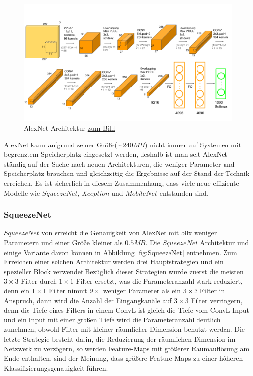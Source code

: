 \documentclass[12pt,a4paper]{scrartcl}
\numberwithin{equation}{section}
\begin{document}
\begin{figure}[h]
	\centering
	\includegraphics[width=\textwidth ]{AlexNet}
	\caption{ AlexNet Architektur \href{https://neurohive.io/en/popular-networks/alexnet-imagenet-classification-with-deep-convolutional-neural-networks/}{ zum Bild} }
	\label{fig:AlexNet}
\end{figure}


AlexNet kann aufgrund seiner Größe($\sim240MB$) nicht immer auf Systemen mit begrenztem Speicherplatz eingesetzt werden, deshalb ist man seit AlexNet ständig auf der Suche nach neuen Architekturen, die weniger Parameter und Speicherplatz brauchen und  gleichzeitig die Ergebnisse auf der Stand der Technik erreichen. Es ist sicherlich  in diesem Zusammenhang, dass viele neue effiziente Modelle wie $ SqueezeNet $, $ Xception $ und $ MobileNet $ entstanden sind.\\


\subsubsection{SqueezeNet}
$ SqueezeNet $ von \cite[Song Han et al]{SqueezeNet} erreicht die Genauigkeit von AlexNet mit 50x weniger Parametern und  einer Größe kleiner als $ 0.5MB$. Die $ SqueezeNet $ Architektur und einige Variante davon können in Abbildung \ref{fig:SqueezeNet} entnehmen. Zum Erreichen einer solchen Architektur werden drei Hauptstrategien und ein spezieller Block verwendet.Bezüglich dieser Strategien wurde zuerst die meisten $ 3\times3 $ Filter durch $ 1\times1 $ Filter ersetzt, was die Parameteranzahl stark reduziert, denn ein $ 1\times1 $ Filter nimmt $ 9\times $ weniger Parameter als ein $ 3\times3 $ Filter in Anspruch, dann wird die Anzahl der Eingangkanäle auf $ 3\times3 $ Filter verringern, denn die Tiefe eines Filters in einem \ac{ConvL} ist gleich die Tiefe vom \ac{ConvL} Input und ein Input mit einer großen Tiefe wird die Parameteranzahl deutlich zunehmen, obwohl Filter mit kleiner räumlicher Dimension benutzt werden. Die letzte Strategie besteht darin, die Reduzierung der räumlichen Dimension im Netzwerk zu verzögern, so werden Feature-Maps mit größerer Raumauflösung am Ende enthalten. \cite[Song Han et al]{SqueezeNet} sind der Meinung, dass größere Feature-Maps zu einer höheren Klassifizierungsgenauigkeit führen. 
\end{document}
